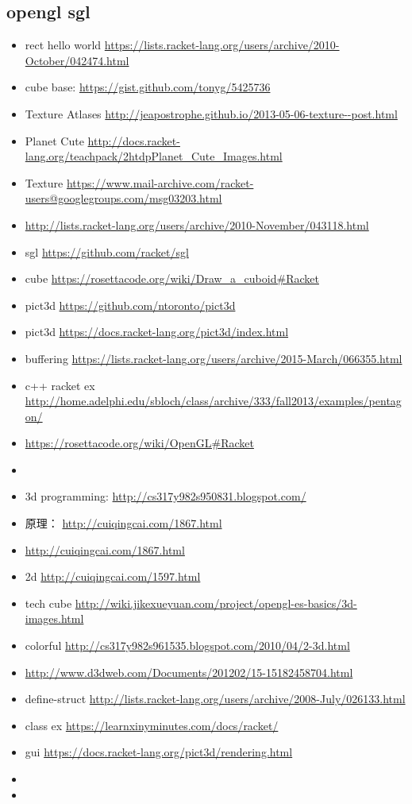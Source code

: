 \documentclass[9pt,b5paper]{article}
\begin{document}
\subsection{opengl sgl}
\label{sec-2-1}
\begin{itemize}
\item rect hello world \url{https://lists.racket-lang.org/users/archive/2010-October/042474.html}
\item cube base: \url{https://gist.github.com/tonyg/5425736}
\item Texture Atlases \url{http://jeapostrophe.github.io/2013-05-06-texture--post.html}
\item Planet Cute \url{http://docs.racket-lang.org/teachpack/2htdpPlanet_Cute_Images.html}
\item Texture \url{https://www.mail-archive.com/racket-users@googlegroups.com/msg03203.html}
\item \url{http://lists.racket-lang.org/users/archive/2010-November/043118.html}
\item sgl \url{https://github.com/racket/sgl}
\item cube \url{https://rosettacode.org/wiki/Draw_a_cuboid#Racket}
\item pict3d \url{https://github.com/ntoronto/pict3d}
\item pict3d \url{https://docs.racket-lang.org/pict3d/index.html}
\item buffering \url{https://lists.racket-lang.org/users/archive/2015-March/066355.html}
\item c++ racket ex \url{http://home.adelphi.edu/sbloch/class/archive/333/fall2013/examples/pentagon/}
\item \url{https://rosettacode.org/wiki/OpenGL#Racket}
\item 
\item 3d programming: \url{http://cs317y982s950831.blogspot.com/}
\item 原理： \url{http://cuiqingcai.com/1867.html}
\item \url{http://cuiqingcai.com/1867.html}
\item 2d \url{http://cuiqingcai.com/1597.html}
\item tech cube \url{http://wiki.jikexueyuan.com/project/opengl-es-basics/3d-images.html}
\item colorful \url{http://cs317y982s961535.blogspot.com/2010/04/2-3d.html}
\item \url{http://www.d3dweb.com/Documents/201202/15-15182458704.html}
\item define-struct \url{http://lists.racket-lang.org/users/archive/2008-July/026133.html}
\item class ex \url{https://learnxinyminutes.com/docs/racket/}
\item gui \url{https://docs.racket-lang.org/pict3d/rendering.html}
\item 
\item 
\end{itemize}
\end{document}
